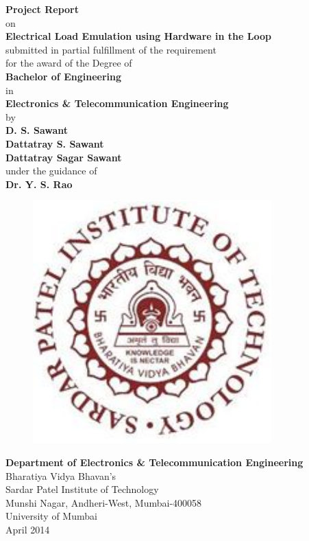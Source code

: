 \begin{titlepage}
\vspace*{0.25cm}
{\centering
\large
{\textbf {Project Report}} \\
on\\
{\Large\textbf {Electrical Load Emulation using Hardware in the Loop}}\\
\vspace{0.75cm}
submitted in partial fulfillment of the requirement\\
for the award of the Degree of\\\vspace{1cm}
{\large\textbf {Bachelor of Engineering}}\\
in \\
{\large\textbf {Electronics \& Telecommunication Engineering}}\\
\vspace{0.75cm}
by\\
\vspace{0.75cm}
{\large \textbf {D. S. Sawant}}\\
{\large \textbf {Dattatray S. Sawant}}\\
{\large \textbf {Dattatray Sagar Sawant}}\\
\vspace{0.75cm} 
under the guidance of\\ 
\vspace{0.75cm}
\hspace{.05cm} {\large \textbf {Dr. Y. S. Rao }}\\
\begin{figure}[h]
\centering
\includegraphics[scale=0.8]{spitlogo.pdf}
\end{figure}
\hspace{.05cm}
\hspace{.05cm}
\textbf {Department of Electronics \& Telecommunication Engineering}\\
Bharatiya  Vidya Bhavan's\\
Sardar Patel Institute of Technology\\
Munshi Nagar, Andheri-West, Mumbai-400058\\
University of Mumbai\\
\hspace{7.25cm}April 2014}\\
\end{titlepage}
\newpage

